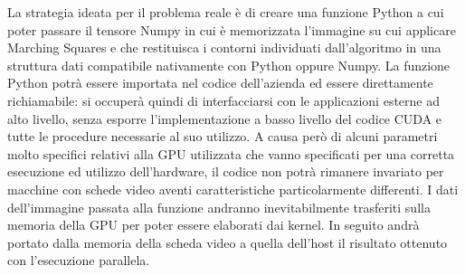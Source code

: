 \documentclass[12pt,a4paper]{report}
\begin{document}
La strategia ideata per il problema reale è di creare una funzione Python a cui poter passare il tensore Numpy in cui è memorizzata l'immagine su cui applicare Marching Squares e che restituisca i contorni individuati dall'algoritmo in una struttura dati compatibile nativamente con Python oppure Numpy. \newline
La funzione Python potrà essere importata nel codice dell'azienda ed essere direttamente richiamabile: si occuperà quindi di interfacciarsi con le applicazioni esterne ad alto livello, senza esporre l'implementazione a basso livello del codice CUDA e tutte le procedure necessarie al suo utilizzo. 
A causa però di alcuni parametri molto specifici relativi alla GPU utilizzata che vanno specificati per una corretta esecuzione ed utilizzo dell'hardware, il codice non potrà rimanere invariato per macchine con schede video aventi caratteristiche particolarmente differenti.
I dati dell'immagine passata alla funzione andranno inevitabilmente trasferiti sulla memoria della GPU per poter essere elaborati dai kernel. In seguito andrà portato dalla memoria della scheda video a quella dell'host il risultato ottenuto con l'esecuzione parallela. %
\end{document}
